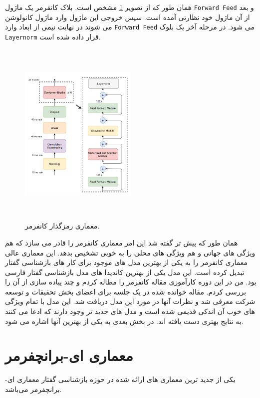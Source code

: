  همان طور که از تصویر \ref{fig:conformer}
مشخص است.
بلاک کانقرمر یک ماژول 
  \verb|Forward Feed|
  و بعد از آن ماژول 
  خود نظارتی
  آمده است.
  سپس خروجی این ماژول وارد ماژول  کانولوشن می شوند
  در نهایت نیمی از ابعاد  وارد 
  \verb|Forward Feed|
  می شود.
  در مرحله آخر یک بلوک 
  \verb|Layernorm|
  قرار داده شده است.
  
 \begin{figure}[H]
  \centering
  \includegraphics[width=0.5\textwidth,height=9cm]{Images/Chapter2/conformer.png}
  \caption{
  معماری رمزگذار کانفرمر. 
  }
  \label{fig:conformer}
\end{figure}



همان طور که پیش تر گفته شد این امر معماری کانفرمر را قادر می سازد که هم ویژگی های جهانی و هم ویژگی های محلی را به خوبی تشخیص بدهد. این معماری عالی معماری کانفرمر را به یکی از بهترین مدل های موجود برای کار های 
بازشناسی گفتار
تبدیل کرده است.
این مدل یکی از بهترین کاندیدا های مدل 
بازشناسی گفتار فارسی
بود. من در این دوره کارآموزی مقاله کانفرمر را مطاله کردم و چند پیاده سازی از آن را بررسی کردم. مقاله خوانده شده در یک جلسه برای اعضای بخش تحقیقات و توسعه شرکت معرفی شد و نظرات آنها در مورد این مدل دریافت شد.
این مدل با تمام ویژگی های خوب آن اندکی قدیمی شده است و مدل های جدید تر وجود دارند که ادعا می کنند به نتایج بهتری دست یافته اند.
در بخش بعدی به یکی از بهترین آنها اشاره می شود.

\section{معماری ای-برانچفرمر}
یکی از جدید ترین معماری های ارائه شده در حوزه 
بازشناسی گفتار
معماری 
ای-برانچفرمر
می‌باشد.

